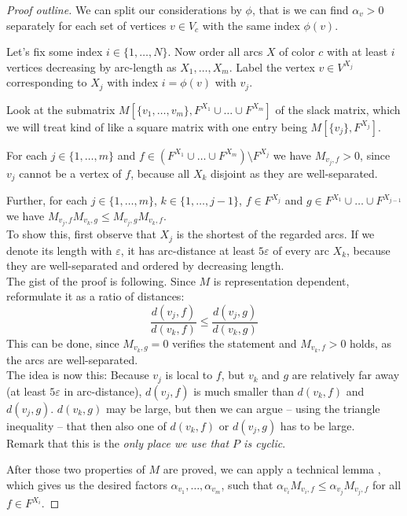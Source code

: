 \begin{proof}[Proof outline]
  We can split our considerations by $\phi$, that is we can find $\alpha_v > 0$ separately for each set of vertices $v \in V_c$ with the same index $\phi(v)$.

  Let's fix some index $i \in \{1,\dots,N\}$. Now order all arcs $X$ of color $c$ with at least $i$ vertices decreasing by arc-length as $X_1,\dots,X_m$. Label the vertex $v \in V^{X_j}$ corresponding to $X_j$ with index $i = \phi(v)$ with $v_j$.

  Look at the submatrix $M \left[ \{v_1, \dots, v_m\},F^{X_1} \cup \dots \cup F^{X_m} \right]$ of the slack matrix, which we will treat kind of like a square matrix with one entry being $M \left[ \{v_j\},F^{X_j} \right]$.

  For each $j \in \{1,\dots,m\}$ and $f \in (F^{X_1} \cup \dots \cup F^{X_m}) \setminus F^{X_j}$ we have $M_{v_j, f} > 0$, since $v_j$ cannot be a vertex of $f$, because all $X_k$ disjoint as they are well-separated.

  Further, for each $j \in \{1,\dots,m\}$, $k \in \{1,\dots,j-1\}$, $f \in F^{X_j}$ and $g \in F^{X_1} \cup \dots \cup F^{X_{j-1}}$ we have $M_{v_j,f}M_{v_k,g} \leq M_{v_j,g}M_{v_k,f}$. \\
  To show this, first observe that $X_j$ is the shortest of the regarded arcs. If we denote its length with $\varepsilon$, it has arc-distance at least $5\varepsilon$ of every arc $X_k$, because they are well-separated and ordered by decreasing length.\\
  The gist of the proof is following. Since $M$ is representation dependent, reformulate it as a ratio of distances:
  $$\frac{d(v_j,f)}{d(v_k,f)} \leq \frac{d(v_j,g)}{d(v_k,g)}$$
  This can be done, since $M_{v_k,g} = 0$ verifies the statement and $M_{v_k,f} > 0$ holds, as the arcs are well-separated.\\
  The idea is now this: Because $v_j$ is local to $f$, but $v_k$ and $g$ are relatively far away (at least $5\varepsilon$ in arc-distance), $d(v_j,f)$ is much smaller than $d(v_k,f)$ and $d(v_j,g)$. $d(v_k,g)$ may be large, but then we can argue -- using the triangle inequality -- that then also one of $d(v_k,f)$ or $d(v_j,g)$ has to be large.\\
  Remark that this is the \emph{only place we use that $P$ is cyclic}.

  After those two properties of $M$ are proved, we can apply a technical lemma \cite[Lemma 10.3]{kwan2020extension}, which gives us the desired factors $\alpha_{v_1}, \dots, \alpha_{v_m}$, such that $\alpha_{v_i} M_{v_i,f} \leq \alpha_{v_j} M_{v_j,f}$ for all $f \in F^{X_i}$.
\end{proof}

